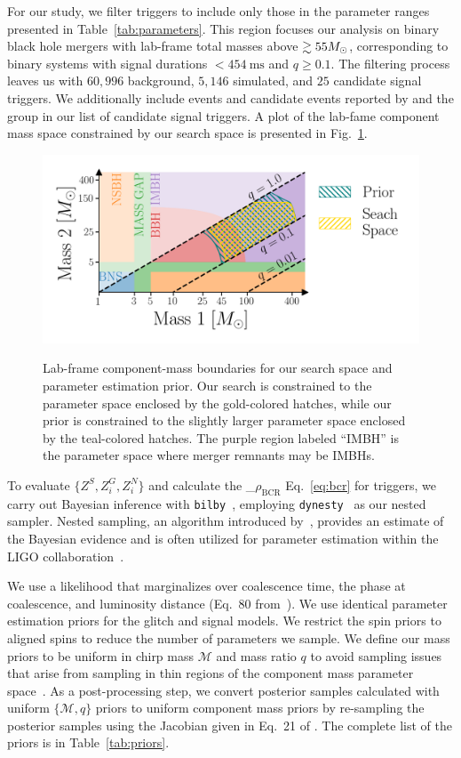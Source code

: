 \documentclass[
 nofootinbib,
 amsmath,amssymb,
 aps,
 twocolumn,
 superscriptaddress
]{revtex4-2}
\newcommand{\code}[1]{{\texttt{#1}}\xspace}
\newcommand{\bilby}{\code{bilby}}
\newcommand{\dynesty}{\code{dynesty}}
\newcommand{\pycbc}{{\sc {{PyCBC}}}\xspace}
\newcommand{\GWTC}{{\sc {{GWTC-1}}}\xspace}
\newcommand{\IAS}{{\sc {{IAS}}}\xspace}
\newcommand{\mathcmd}[1]{{\sc \relax\ifmmode#1\else $#1$\fi}\xspace}
\newcommand{\bcr}{\mathcmd{\rho_\text{BCR}}}
\newcommand{\msun}{\mathcmd{M_\odot}}
\begin{document}
For our study, we filter \pycbc triggers to include only those in the parameter ranges presented in Table~\ref{tab:parameters}. This region focuses our analysis on binary black hole mergers with lab-frame total masses above ${\gtrsim55 \msun}$, corresponding to binary systems with signal durations $<454 \ \text{ms}$ and ${q\geq0.1}$. The filtering process leaves us with $60,996$ background, $5,146$ simulated, and $25$ candidate signal triggers. We additionally include events and candidate events reported by \GWTC and the \IAS group in our list of candidate signal triggers.  A plot of the lab-fame component mass space constrained by our search space is presented in Fig.~\ref{fig:templateBank}.

\begin{figure}[!ht]
{\centering \includegraphics[width=0.75\linewidth]{images/template_bank.png}
}
\caption[ BCR search space.]{Lab-frame component-mass boundaries for our search space and parameter estimation prior. Our search is constrained to the parameter space enclosed by the gold-colored hatches, while our prior is constrained to the slightly larger parameter space enclosed by the teal-colored hatches. The purple region labeled ``IMBH'' is the parameter space where merger remnants may be IMBHs.}\label{fig:templateBank}
\end{figure}


To evaluate $\{Z^S, Z^G_i, Z^N_i\}$ and calculate the \bcr Eq.~\ref{eq:bcr} for triggers, we carry out Bayesian inference with \bilby~\cite{bilby, bilby_pipe}, employing \dynesty~\cite{dynesty} as our nested sampler. Nested sampling, an algorithm introduced by~\citet{skilling2004, skilling2006}, provides an estimate of the Bayesian evidence and is often utilized for parameter estimation within the LIGO collaboration~\cite{bilby, bilby_paper, pbilby_paper}.

We use a likelihood that marginalizes over coalescence time, the phase at coalescence, and luminosity distance (Eq.~80 from~\citet{intro_to_gw_bayes}). We use identical parameter estimation priors for the glitch and signal models. We restrict the spin priors to aligned spins to reduce the number of parameters we sample. We define our mass priors to be uniform in chirp mass $\mathcal{M}$ and mass ratio $q$ to avoid sampling issues that arise from sampling in thin regions of the component mass parameter space~\cite{bilby_gwtc}. As a post-processing step, we convert posterior samples calculated with uniform $\{\mathcal{M}, q\}$ priors to uniform component mass priors by re-sampling the posterior samples using the Jacobian given in Eq.~21 of \citet{Veitch:2015:PhRvD}. The complete list of the priors is in Table~\ref{tab:priors}.
\end{document}
